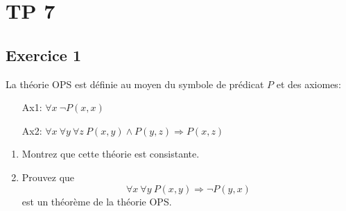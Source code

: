 \section{TP 7}

\subsection*{Exercice 1}
La th\'{e}orie OPS est d\'{e}finie au moyen du symbole de pr\'{e}dicat $P$ et des axiomes:
\begin{enumerate}
\item[Ax1:] $\forall x \ \neg P(x, x)$
\item[Ax2:] $\forall x \ \forall y \ \forall z \ P(x, y) \wedge P(y, z) \Rightarrow P(x, z)$
\end{enumerate}

\begin{enumerate}
\item Montrez que cette th\'{e}orie est consistante.
\item Prouvez que
$$
\forall x \ \forall y \ P(x, y) \Rightarrow \neg P(y, x)
$$
est un th\'{e}or\`{e}me de la th\'{e}orie OPS.
\end{enumerate}

